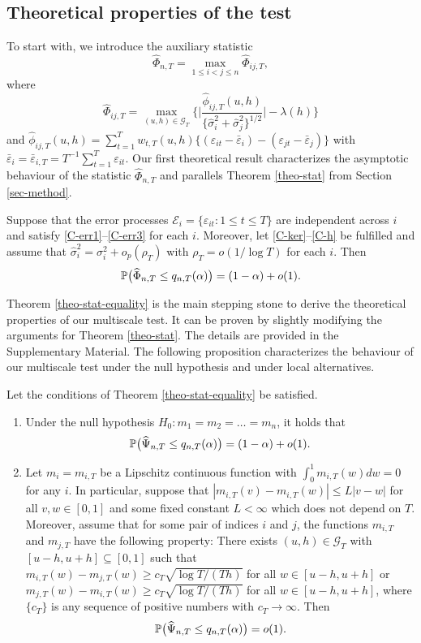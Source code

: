\subsection{Theoretical properties of the test}\label{subsec-test-equality-theo}


To start with, we introduce the auxiliary statistic 
\[ \widehat{\Phi}_{n,T} = \max_{1 \le i < j \le n} \widehat{\Phi}_{ij,T}, \]
where
\[ \widehat{\Phi}_{ij,T} = \max_{(u,h) \in \mathcal{G}_T} \Big\{ \Big| \frac{\widehat{\phi}_{ij,T}(u,h)} {\{ \widehat{\sigma}_i^2 + \widehat{\sigma}_j^2 \}^{1/2}} \Big| - \lambda(h) \Big \} \]
and $\widehat{\phi}_{ij,T}(u,h) = \sum_{t=1}^T w_{t,T}(u,h) \{ (\varepsilon_{it} - \bar{\varepsilon}_i) - (\varepsilon_{jt} - \bar{\varepsilon}_j) \}$ with $\bar{\varepsilon}_i = \bar{\varepsilon}_{i,T} = T^{-1} \sum_{t=1}^T \varepsilon_{it}$. Our first theoretical result characterizes the asymptotic behaviour of the statistic $\widehat{\Phi}_{n,T}$ and parallels Theorem \ref{theo-stat} from Section \ref{sec-method}. 
\begin{theorem}\label{theo-stat-equality}
Suppose that the error processes $\mathcal{E}_i = \{ \varepsilon_{it}: 1 \le t \le T \}$ are independent across $i$ and satisfy \ref{C-err1}--\ref{C-err3} for each $i$. Moreover, let \ref{C-ker}--\ref{C-h} be fulfilled and assume that $\widehat{\sigma}_i^2 = \sigma_i^2 + o_p(\rho_T)$ with $\rho_T = o(1/\log T)$ for each $i$. Then 
\[ \mathbb{P} \big( \widehat{\Phi}_{n,T} \le q_{n,T}(\alpha) \big) = (1 - \alpha) + o(1). \]
\end{theorem}
Theorem \ref{theo-stat-equality} is the main stepping stone to derive the theoretical properties of our multiscale test. It can be proven by slightly modifying the arguments for Theorem \ref{theo-stat}. The details are provided in the Supplementary Material. The following proposition characterizes the behaviour of our multiscale test under the null hypothesis and under local alternatives. 
\begin{prop}\label{prop-test-equality}
Let the conditions  of Theorem \ref{theo-stat-equality} be satisfied. 
\begin{enumerate}[label=(\alph*),leftmargin=0.75cm]
\item Under the null hypothesis $H_0: m_1 = m_2 = \ldots = m_n$, it holds that 
\[ \mathbb{P} \big( \widehat{\Psi}_{n,T} \le q_{n,T}(\alpha) \big) = (1 - \alpha) + o(1). \]
\item Let $m_i = m_{i,T}$ be a Lipschitz continuous function with $\int_0^1 m_{i,T}(w) dw = 0$ for any $i$. In particular, suppose that $|m_{i,T}(v) - m_{i,T}(w)| \le L |v - w|$ for all $v,w \in [0,1]$ and some fixed constant $L < \infty$ which does not depend on $T$. Moreover, assume that for some pair of indices $i$ and $j$, the functions $m_{i,T}$ and $m_{j,T}$ have the following property: There exists $(u,h) \in \mathcal{G}_T$ with $[u-h,u+h] \subseteq [0,1]$ such that $m_{i,T}(w) - m_{j,T}(w) \ge c_T \sqrt{\log T/(Th)}$ for all $w \in [u-h,u+h]$ or $m_{j,T}(w) - m_{i,T}(w) \ge c_T \sqrt{\log T/(Th)}$ for all $w \in [u-h,u+h]$, where $\{c_T\}$ is any sequence of positive numbers with $c_T \rightarrow \infty$. Then 
\[ \mathbb{P} \big( \widehat{\Psi}_{n,T} \le q_{n,T}(\alpha) \big) = o(1). \]
\end{enumerate}
\end{prop}
